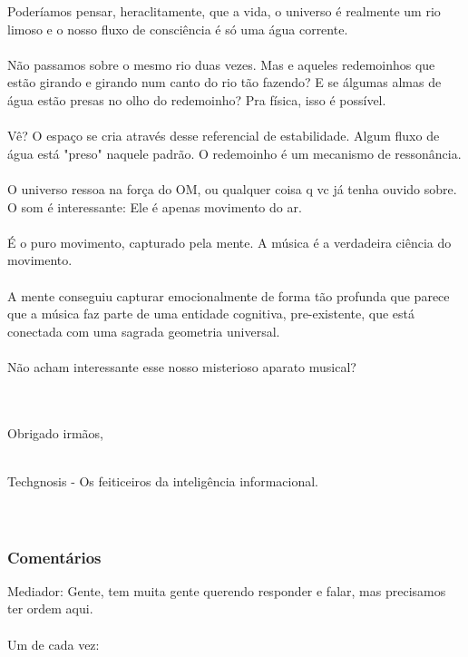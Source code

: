 \documentclass[11pt]{article}
\begin{document}
Poderíamos pensar, heraclitamente, que a vida, o universo é realmente um rio limoso e o nosso fluxo de consciência é só uma água corrente.\\\\ 

Não passamos sobre o mesmo rio duas vezes. Mas e aqueles redemoinhos que estão girando e girando num canto do rio tão fazendo? E se álgumas almas de água estão presas no olho do redemoinho? Pra física, isso é possível.\\\\

Vê? O espaço se cria através desse referencial de estabilidade. Algum fluxo de água está "preso" naquele padrão. O redemoinho é um mecanismo de ressonância.\\\\

O universo ressoa na força do OM, ou qualquer coisa q vc já tenha ouvido sobre. O som é interessante: Ele é apenas movimento do ar.\\\\

É o puro movimento, capturado pela mente. A música é a verdadeira ciência do movimento. \\\\

A mente conseguiu capturar emocionalmente de forma tão profunda que parece que a música faz parte de uma entidade cognitiva, pre-existente, que está conectada com uma sagrada geometria universal.\\\\ Não acham interessante esse nosso misterioso aparato musical?\\\\\

Obrigado irmãos,\\\

Techgnosis - Os feiticeiros da inteligência informacional.\\\\\


\subsubsection{Comentários}

Mediador: Gente, tem muita gente querendo responder e falar, mas precisamos ter ordem aqui. \\\\ Um de cada vez:\\\
\end{document}
